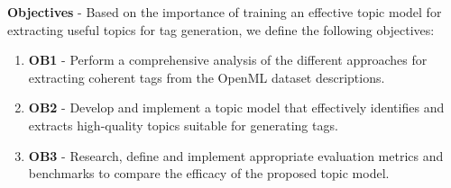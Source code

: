\documentclass{article}
\begin{document}


\textbf{Objectives} - Based on the importance of training an effective topic model for extracting useful topics for tag generation, we define the following objectives:
\begin{enumerate}
    \item{\textbf{OB1} - Perform a comprehensive analysis of the different approaches for extracting coherent tags from the OpenML dataset descriptions.
          }
    \item{\textbf{OB2} - Develop and implement a topic model that effectively identifies and extracts high-quality topics suitable for generating tags.
          }
    \item{\textbf{OB3} - Research, define and implement appropriate evaluation metrics and benchmarks to compare the efficacy of the proposed topic model.
          }
\end{enumerate}
\end{document}
